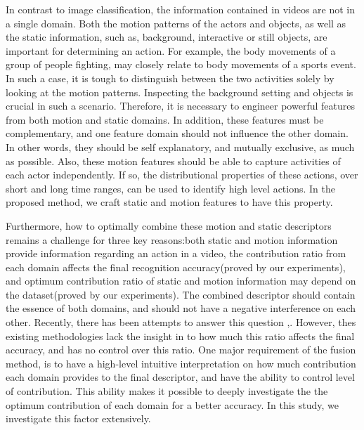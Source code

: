 In contrast to image classification, the information contained in videos
are not 
 in a single domain. Both the motion patterns of the actors and objects, as well as the static
 information, such as, background, interactive or still objects, are important for determining an action.
For example, the body movements of a group of people fighting, may closely relate to 
body movements of a sports event. In such a case, it is tough to distinguish between the two 
activities solely by looking at the motion patterns. Inspecting the background setting 
and objects is crucial in such a scenario. Therefore, it is necessary to engineer powerful features
from both motion and static domains. In addition, these features must be complementary, and one feature domain should 
not influence the other domain. In other words, they should be self explanatory, and mutually exclusive, as much as possible. 
Also, these motion features should be able to capture
activities of each actor independently. If so, the distributional properties of these actions, over short
and long time ranges, can be used to identify high level actions. In the proposed method, we craft static and motion features to have this property. 

Furthermore, how to optimally combine these motion and static descriptors remains a challenge for three key reasons:both static and motion information
provide information regarding an action in a video, the contribution ratio from each domain affects the final recognition accuracy(proved by our experiments),
and optimum contribution ratio of static and motion information may depend on the dataset(proved by our experiments).
The combined descriptor should contain the essence of both domains, and should not have a 
negative interference on each other. Recently, there has been attempts to answer this question \cite{7486474},\cite{simonyan2014two}. However,
thes existing methodologies lack the insight in to how much this ratio affects the final accuracy, and has no control over this ratio. 
One major requirement of the fusion method, is to have a high-level intuitive interpretation on how much contribution each domain provides to the 
final descriptor, and have the ability to control level of contribution. This ability makes it possible
to deeply investigate the the optimum contribution of each domain for a better accuracy. In this study, we investigate this factor 
extensively.

